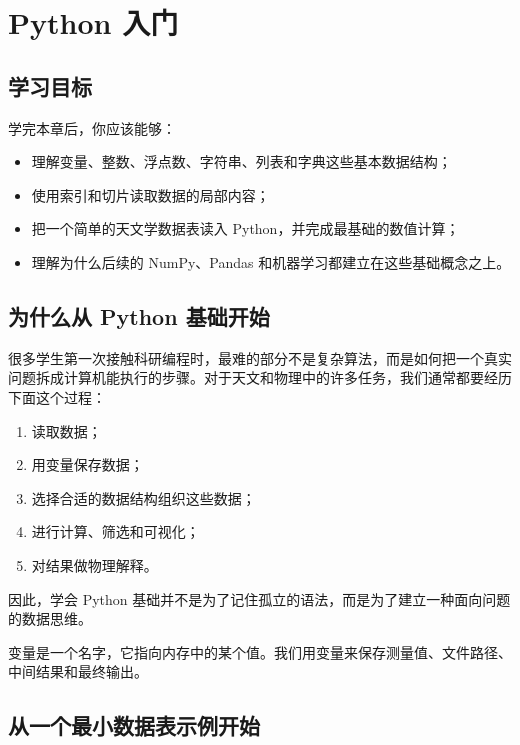 \chapter{Python 入门}

\section{学习目标}

学完本章后，你应该能够：

\begin{itemize}
    \item 理解变量、整数、浮点数、字符串、列表和字典这些基本数据结构；
    \item 使用索引和切片读取数据的局部内容；
    \item 把一个简单的天文学数据表读入 Python，并完成最基础的数值计算；
    \item 理解为什么后续的 NumPy、Pandas 和机器学习都建立在这些基础概念之上。
\end{itemize}

\section{为什么从 Python 基础开始}

很多学生第一次接触科研编程时，最难的部分不是复杂算法，而是如何把一个真实问题拆成计算机能执行的步骤。对于天文和物理中的许多任务，我们通常都要经历下面这个过程：

\begin{enumerate}
    \item 读取数据；
    \item 用变量保存数据；
    \item 选择合适的数据结构组织这些数据；
    \item 进行计算、筛选和可视化；
    \item 对结果做物理解释。
\end{enumerate}

因此，学会 Python 基础并不是为了记住孤立的语法，而是为了建立一种面向问题的数据思维。

\begin{defbox}[变量]
变量是一个名字，它指向内存中的某个值。我们用变量来保存测量值、文件路径、中间结果和最终输出。
\end{defbox}

\section{从一个最小数据表示例开始}

